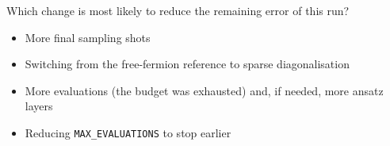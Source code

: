 \documentclass[11pt,a4paper]{article}
\newcommand{\optlabel}[1]{\textbf{(#1)}}
\newenvironment{qitem}[1]{\begin{list}{}{\setlength{\leftmargin}{3.3em}\setlength{\labelwidth}{3.1em}%
  \setlength{\labelsep}{0.2em}\setlength{\topsep}{3pt}\setlength{\parsep}{3pt}}\item[\textbf{Q.#1}\hfill]}{\end{list}}
\newcommand{\qsep}{\par\vspace{2pt}{\color{black!15}\hrule}\vspace{4pt}}
\begin{document}
\begin{qitem}{80}
Which change is most likely to reduce the remaining error of this run?
\begin{itemize}[leftmargin=2.6em, labelsep=0.4em, itemsep=2pt, topsep=3pt]
\item[\optlabel{A}] More final sampling shots
\item[\optlabel{B}] Switching from the free-fermion reference to sparse diagonalisation
\item[\optlabel{C}] More evaluations (the budget was exhausted) and, if needed, more ansatz layers
\item[\optlabel{D}] Reducing \texttt{MAX\_EVALUATIONS} to stop earlier
\end{itemize}
\end{qitem}
\qsep

\newpage
\end{document}
